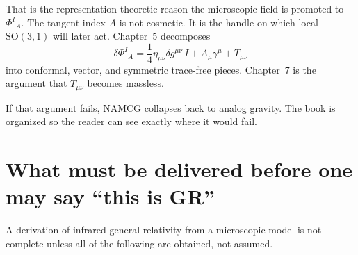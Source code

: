 That is the representation-theoretic reason the microscopic field is
promoted to \(\Phi^I{}_A\). The tangent index \(A\) is not cosmetic. It
is the handle on which local \(\mathrm{SO}(3,1)\) will later act.
Chapter~5 decomposes
\begin{equation}
  \label{eq:lorentz-split}
  \delta\Phi^I{}_A
  =\frac14\eta_{\mu\nu}\delta g^{\mu\nu}\,I
  +A_\mu\gamma^\mu
  +T_{\mu\nu}
\end{equation}
into conformal, vector, and symmetric trace-free pieces. Chapter~7 is
the argument that \(T_{\mu\nu}\) becomes massless.

If that argument fails, NAMCG collapses back to analog gravity. The
book is organized so the reader can see exactly where it would fail.

\section{What must be delivered before one may say ``this is GR''}
\label{sec:ch1-checklist}

A derivation of infrared general relativity from a microscopic model is
not complete unless all of the following are obtained, not assumed.


